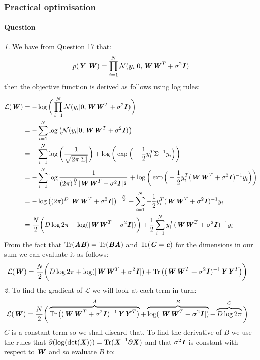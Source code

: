 \documentclass{article}
\newcounter{question}
\newcommand{\question}{\stepcounter{question}\paragraph{Question \thequestion}}
\newcommand{\mat}[1]{\textbf{\textit{#1}}}
\DeclareMathOperator{\Tr}{Tr}
\begin{document}
\subsubsection{Practical optimisation}
\question \emph{1.} We have from Question 17 that:
\begin{align*}
	p(\mat{Y}|\mat{W}) = \prod_{i=1}^N\mathcal{N}(y_i|0,\mat{W}\mat{W}^T + \sigma^2\mat{I})
\end{align*}
then the objective function is derived as follows using log rules:
\begin{align*}
	\mathcal{L}(\mat{W}) &= -\log\bigg(\prod_{i=1}^N\mathcal{N}(y_i|0,\mat{W}\mat{W}^T + \sigma^2\mat{I})\bigg) \\
	&= -\sum_{i=1}^N\log\big(\mathcal{N}(y_i|0,\mat{W}\mat{W}^T + \sigma^2\mat{I})\big) \\
	&= -\sum_{i=1}^N\log\bigg(\frac{1}{\sqrt{2\pi\lvert\Sigma\rvert}}\bigg)+\log\bigg(\exp\Big(-\frac{1}{2}y_i^T\Sigma^{-1} y_i\Big)\bigg) \\
	&= -\sum_{i=1}^N\log\frac{1}{(2\pi)^{\frac{D}{2}}\lvert\mat{W}\mat{W}^T+\sigma^2\mat{I}\rvert^{\frac{1}{2}}}+\log\bigg(\exp\Big(-\frac{1}{2}y_i^T(\mat{W}\mat{W}^T+\sigma^2\mat{I})^{-1} y_i\Big)\bigg) \\
	&= -\log\big((2\pi)^D\lvert\mat{W}\mat{W}^T+\sigma^2\mat{I}\vert\big)^{-\frac{N}{2}} - \sum_{i=1}^N-\frac{1}{2}y_i^T(\mat{W}\mat{W}^T+\sigma^2\mat{I})^{-1} y_i \\
	&= \frac{N}{2}\bigg(D\log2\pi + \log(\lvert\mat{W}\mat{W}^T+\sigma^2\mat{I}\vert)\bigg) + \frac{1}{2}\sum_{i=1}^Ny_i^T(\mat{W}\mat{W}^T+\sigma^2\mat{I})^{-1} y_i \\
\end{align*}
From the fact that $\Tr(\mat{A}\mat{B}) = \Tr(\mat{B}\mat{A})$ and $\Tr(\mat{C} = \mat{c})$ for the dimensions in our sum we can evaluate it as follows:
\begin{align*}
	\mathcal{L}(\mat{W}) &= \frac{N}{2}\bigg(D\log2\pi + \log(\lvert\mat{W}\mat{W}^T+\sigma^2\mat{I}\vert) + \Tr\big((\mat{W}\mat{W}^T+\sigma^2\mat{I})^{-1}\mat{Y}\mat{Y}^T\big)\bigg)
\end{align*}
\emph{2.} To find the gradient of $\mathcal{L}$ we will look at each term in turn:
\begin{align*}
	\mathcal{L}(\mat{W}) &= \frac{N}{2}\bigg(\overbrace{\Tr\big((\mat{W}\mat{W}^T+\sigma^2\mat{I})^{-1}\mat{Y}\mat{Y}^T\big)}^{A} + \overbrace{\log(\lvert\mat{W}\mat{W}^T+\sigma^2\mat{I}\vert)}^{B} + \overbrace{D\log2\pi}^{C}\bigg)
\end{align*}
$C$ is a constant term so we shall discard that. To find the derivative of $B$ we use the rules that $\partial(\log(\det(\mat{X}))) = \Tr(\mat{X}^{-1}\partial\mat{X})$ and that $\sigma^2\mat{I}$ is constant with respect to $\mat{W}$ and so evaluate $B$ to:
\end{document}
